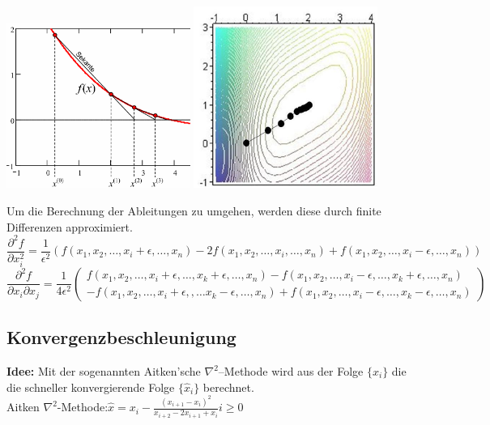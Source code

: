 \begin{minipage}{6cm}
   \includegraphics[width=6cm]{./Content/NonLinearOptimization/QuasiNewton1D}
   \includegraphics[width=6cm]{./Content/NonLinearOptimization/newton}
\end{minipage}


  Um die Berechnung der Ableitungen zu umgehen, werden diese durch finite Differenzen approximiert. 
  $$\frac{\partial^2 f}{\partial x_i^2} = \frac{1}{\epsilon^2} 
  \left( f(x_1, x_2, \ldots, x_i+\epsilon, \ldots, x_n) - 2 f(x_1, x_2, \ldots, x_i, \ldots, x_n) + f(x_1, x_2, \ldots, x_i-\epsilon, \ldots, x_n) \right)$$
  $$\frac{\partial^2 f}{\partial x_i \partial x_j} = \frac{1}{4 \epsilon^2} \begin{pmatrix}
    f(x_1, x_2, \ldots, x_i+\epsilon, \ldots, x_k+\epsilon, \ldots, x_n) - f(x_1, x_2, \ldots, x_i-\epsilon, \ldots, x_k+\epsilon, \ldots, x_n)\\
    -f(x_1, x_2, \ldots, x_i+\epsilon, , \ldots x_k-\epsilon, \ldots, x_n) + f(x_1, x_2, \ldots, x_i-\epsilon, \ldots, x_k-\epsilon, \ldots, x_n)
  \end{pmatrix}$$
 
 \subsection{Konvergenzbeschleunigung}
 \textbf{Idee:} Mit der sogenannten Aitken'sche   $\nabla^2$–Methode wird aus der Folge $\{x_i\}$ die die schneller konvergierende Folge $\{\hat{x}_i\}$ berechnet.\\
 
 Aitken $\nabla^2$-Methode:\quad $\boxed{\hat{x}=x_i-\frac{(x_{i+1}-x_i)^2}{x_{i+2}-2x_{i+1}+x_{i}}}$\qquad $i\geq 0$ %
 
 
 

  